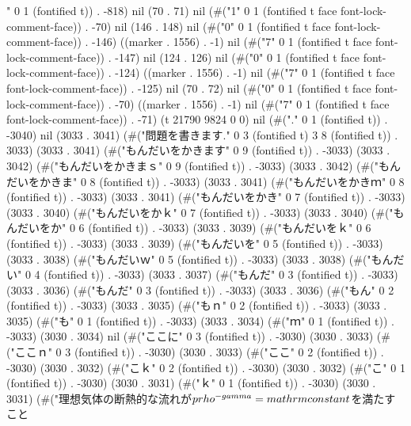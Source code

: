 " 0 1 (fontified t)) . -818) nil (70 . 71) nil (#("1" 0 1 (fontified t face font-lock-comment-face)) . -70) nil (146 . 148) nil (#("0" 0 1 (fontified t face font-lock-comment-face)) . -146) ((marker . 1556) . -1) nil (#("7" 0 1 (fontified t face font-lock-comment-face)) . -147) nil (124 . 126) nil (#("0" 0 1 (fontified t face font-lock-comment-face)) . -124) ((marker . 1556) . -1) nil (#("7" 0 1 (fontified t face font-lock-comment-face)) . -125) nil (70 . 72) nil (#("0" 0 1 (fontified t face font-lock-comment-face)) . -70) ((marker . 1556) . -1) nil (#("7" 0 1 (fontified t face font-lock-comment-face)) . -71) (t 21790 9824 0 0) nil (#("." 0 1 (fontified t)) . -3040) nil (3033 . 3041) (#("問題を書きます." 0 3 (fontified t) 3 8 (fontified t)) . 3033) (3033 . 3041) (#("もんだいをかきます" 0 9 (fontified t)) . -3033) (3033 . 3042) (#("もんだいをかきまｓ" 0 9 (fontified t)) . -3033) (3033 . 3042) (#("もんだいをかきま" 0 8 (fontified t)) . -3033) (3033 . 3041) (#("もんだいをかきｍ" 0 8 (fontified t)) . -3033) (3033 . 3041) (#("もんだいをかき" 0 7 (fontified t)) . -3033) (3033 . 3040) (#("もんだいをかｋ" 0 7 (fontified t)) . -3033) (3033 . 3040) (#("もんだいをか" 0 6 (fontified t)) . -3033) (3033 . 3039) (#("もんだいをｋ" 0 6 (fontified t)) . -3033) (3033 . 3039) (#("もんだいを" 0 5 (fontified t)) . -3033) (3033 . 3038) (#("もんだいｗ" 0 5 (fontified t)) . -3033) (3033 . 3038) (#("もんだい" 0 4 (fontified t)) . -3033) (3033 . 3037) (#("もんだ" 0 3 (fontified t)) . -3033) (3033 . 3036) (#("もんだ" 0 3 (fontified t)) . -3033) (3033 . 3036) (#("もん" 0 2 (fontified t)) . -3033) (3033 . 3035) (#("もｎ" 0 2 (fontified t)) . -3033) (3033 . 3035) (#("も" 0 1 (fontified t)) . -3033) (3033 . 3034) (#("ｍ" 0 1 (fontified t)) . -3033) (3030 . 3034) nil (#("ここに" 0 3 (fontified t)) . -3030) (3030 . 3033) (#("ここｎ" 0 3 (fontified t)) . -3030) (3030 . 3033) (#("ここ" 0 2 (fontified t)) . -3030) (3030 . 3032) (#("こｋ" 0 2 (fontified t)) . -3030) (3030 . 3032) (#("こ" 0 1 (fontified t)) . -3030) (3030 . 3031) (#("ｋ" 0 1 (fontified t)) . -3030) (3030 . 3031) (#("理想気体の断熱的な流れが$p\\rho^{-\\gamma}=\\mathrm{constant}$を満たすこと
